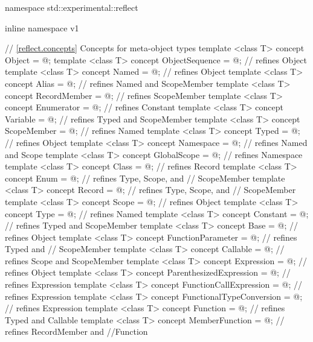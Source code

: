 \begin{std.txt}\color{addclr}
\begin{codeblock}
namespace std::experimental::reflect {
inline namespace v1 {

// \ref{reflect.concepts} Concepts for meta-object types
template <class T> concept Object = @\seebelow@;
template <class T> concept ObjectSequence = @\seebelow@; // refines Object
template <class T> concept Named = @\seebelow@;          // refines Object
template <class T> concept Alias = @\seebelow@;          // refines Named and ScopeMember
template <class T> concept RecordMember = @\seebelow@;   // refines ScopeMember
template <class T> concept Enumerator = @\seebelow@;     // refines Constant
template <class T> concept Variable = @\seebelow@;       // refines Typed and ScopeMember
template <class T> concept ScopeMember = @\seebelow@;    // refines Named
template <class T> concept Typed = @\seebelow@;          // refines Object
template <class T> concept Namespace = @\seebelow@;      // refines Named and Scope
template <class T> concept GlobalScope = @\seebelow@;    // refines Namespace
template <class T> concept Class = @\seebelow@;          // refines Record
template <class T> concept Enum = @\seebelow@;           // refines Type, Scope, and
                                                       // ScopeMember
template <class T> concept Record = @\seebelow@;         // refines Type, Scope, and
                                                       // ScopeMember
template <class T> concept Scope = @\seebelow@;          // refines Object
template <class T> concept Type = @\seebelow@;           // refines Named
template <class T> concept Constant = @\seebelow@;       // refines Typed and ScopeMember
template <class T> concept Base = @\seebelow@;           // refines Object
template <class T> concept FunctionParameter = @\seebelow@; // refines Typed and
                                                          // ScopeMember
template <class T> concept Callable = @\seebelow@;       // refines Scope and ScopeMember
template <class T> concept Expression = @\seebelow@;     // refines Object
template <class T> concept ParenthesizedExpression = @\seebelow@;  // refines Expression
template <class T> concept FunctionCallExpression = @\seebelow@;   // refines Expression
template <class T> concept FunctionalTypeConversion = @\seebelow@; // refines Expression
template <class T> concept Function = @\seebelow@;       // refines Typed and Callable
template <class T> concept MemberFunction = @\seebelow@; // refines RecordMember and
                                                       //Function
}}
\end{codeblock}
\end{std.txt}
